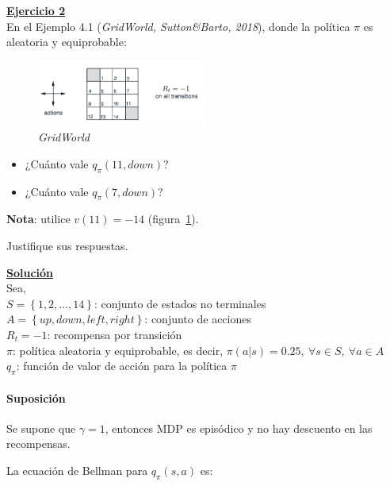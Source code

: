 \indent\underline{\textbf{Ejercicio 2}}\\
En el Ejemplo 4.1 (\textit{GridWorld, Sutton\&Barto, 2018}), donde la política $\pi$ es aleatoria y equiprobable:

\begin{figure}[H]
    \centering
    \includegraphics[width=0.5\textwidth]{../img/gridworld}
    \caption{\textit{GridWorld}~\cite{Sutton2018}}
    \label{fig:gridworld}
\end{figure}

\begin{itemize}
    \item ¿Cuánto vale $q_{\pi}(11,down)$?
    \item ¿Cuánto vale $q_{\pi}(7,down)$?
\end{itemize}

\indent\textbf{Nota}: utilice $v(11)=-14$ (figura~\ref{fig:gridworld}).

Justifique sus respuestas.

\indent\underline{\textbf{Solución}}\\
Sea,\\
$S=\left\{ 1, 2, \ldots, 14 \right\}$: conjunto de estados no terminales\footnotemark\\
$A=\left\{up,down,left,right\right\}$: conjunto de acciones\\
$R_t = -1$: recompensa por transición\\
$\pi$: política aleatoria y equiprobable, es decir, $\pi(a|s)=0.25, \ \forall s \in S, \ \forall a \in A$\\
$q_{\pi}$: función de valor de acción para la política $\pi$\\


\paragraph{Suposición} Se supone que $\gamma=1$, entonces MDP es episódico y no hay descuento en las recompensas.

La ecuación de Bellman para $q_{\pi}(s,a)$ es:

